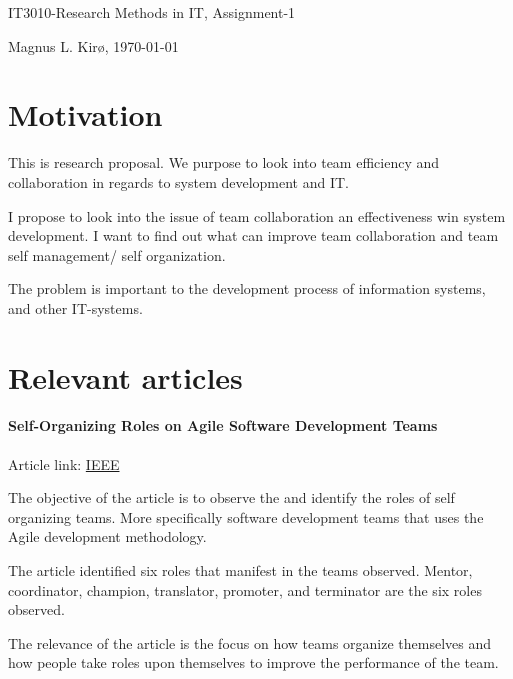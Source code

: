 \documentclass[12pt, a4paper]{article}
\begin{document}

\large{IT3010-Research Methods in IT, Assignment-1}

\normalsize
Magnus L. Kirø, \today




\section{Motivation}
This is research proposal. We purpose to look into team efficiency and
collaboration in regards to system development and IT. 

I propose to look into the issue of team collaboration an effectiveness win
system development. I want to find out what can improve team collaboration and
team self management/ self organization.    

The problem is important to the development process of information systems, and
other IT-systems.  

\section{Relevant articles}

\paragraph{Self-Organizing Roles on Agile Software Development Teams} 
Article link: \href{http://ieeexplore.ieee.org/xpl/articleDetails.jsp?tp=&arnumber=6197202&url=http%3A%2F%2Fieeexplore.ieee.org%2Fxpls%2Fabs_all.jsp%3Farnumber%3D6197202}{IEEE}

The objective of the article is to observe the and identify the roles of self
organizing teams. More specifically software development teams that uses the
Agile development methodology. 

The article identified six roles that manifest in the teams observed. Mentor,
coordinator, champion, translator, promoter, and terminator are the six roles
observed. 

The relevance of the article is the focus on how teams organize themselves and
how people take roles upon themselves to improve the performance of the team. 
\end{document}
